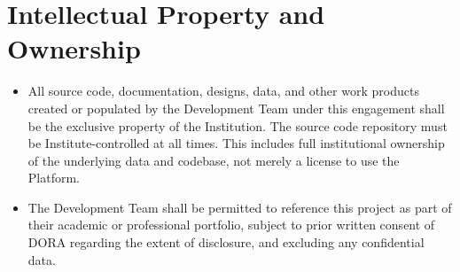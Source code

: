 \documentclass[11pt]{article}
\begin{document}
\section{Intellectual Property and Ownership}
\begin{itemize}[leftmargin=1.4em, itemsep=3pt]
\item All source code, documentation, designs, data, and other work products created or populated by the Development Team under this engagement shall be the exclusive property of the Institution. The source code repository must be Institute-controlled at all times. This includes full institutional ownership of the underlying data and codebase, not merely a license to use the Platform.
\item The Development Team shall be permitted to reference this project as part of their academic or professional portfolio, subject to prior written consent of DORA regarding the extent of disclosure, and excluding any confidential data.
\end{itemize}

\end{document}
